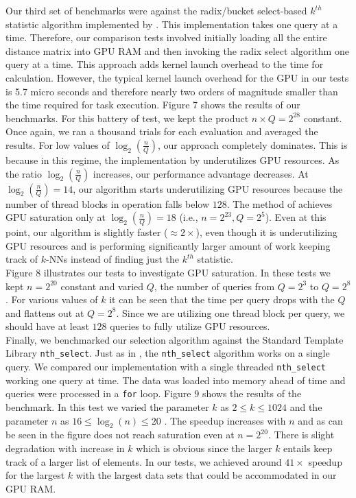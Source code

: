 \documentclass[10pt]{article}
\begin{document}
 
Our third set of benchmarks were against the radix/bucket select-based $k^{th}$ statistic algorithm implemented by \cite{Alabi:2012}. This implementation takes one query at a time. Therefore, our comparison tests involved initially loading all the entire distance matrix into GPU RAM and then invoking the radix select algorithm one query at a time. This approach adds kernel launch overhead to the time for calculation. However, the typical kernel launch overhead for the GPU  in our tests is 5.7 micro seconds and therefore nearly two orders of magnitude smaller than the time required for task execution. Figure 7 shows the results of our benchmarks. For this battery of test, we kept the product $n \times Q = 2^{28}$ constant. Once again, we ran a thousand trials for each evaluation and averaged the results.  For low values of $\log_2\left(\frac{n}{Q}\right)$, our approach completely dominates. This is because in this regime, the implementation by \cite{Alabi:2012} underutilizes GPU resources. As the ratio $\log_2\left(\frac{n}{Q}\right)$ increases, our performance advantage decreases. At $\log_2\left(\frac{n}{Q}\right)=14$, our algorithm starts underutilizing GPU resources because the number of thread blocks in operation falls below $128$. The method of \cite{Alabi:2012} achieves GPU saturation only at $\log_2\left(\frac{n}{Q}\right)=18$ (i.e., $n=2^{23}, Q = 2^5$). Even at this point, our algorithm is slightly faster ($\approx 2 \times$), even though it is underutilizing GPU resources and is performing significantly larger amount of work keeping track of $k$-NNs instead of finding just the $k^{th}$ statistic.\\

Figure 8 illustrates our tests to investigate GPU saturation. In these tests we kept $n=2^{20}$ constant and varied $Q$, the number of queries from $Q=2^3$ to $Q=2^8$. For various values of $k$ it can be seen that the time per query drops with the $Q$ and flattens out at $Q=2^8$. Since we are utilizing one thread block per query, we should have at least $128$ queries to fully utilize GPU resources.  \\

Finally, we benchmarked our selection algorithm against the Standard Template Library \texttt{nth\_select}. Just as in \cite{Alabi:2012}, the \texttt{nth\_select} algorithm works on a single query. We compared our implementation with a single threaded \texttt{nth\_select} working one query at time. The data was loaded into memory ahead of time and queries were processed in a \texttt{for} loop.  Figure 9 shows the results of the benchmark. In this test we varied the parameter $k$ as $2\le k \le 1024$ and the parameter $n$ as $16 \le \log_2(n) \le 20$ .  The speedup increases with $n$ and as can be seen in the figure does not reach saturation even at $n=2^{20}$. There is slight degradation with increase in $k$ which is obvious since the larger $k$ entails keep track of a larger list of elements. In our tests, we achieved around $41 \times$ speedup for the largest $k$ with the largest data sets that could be accommodated in our GPU RAM. 
\end{document}
